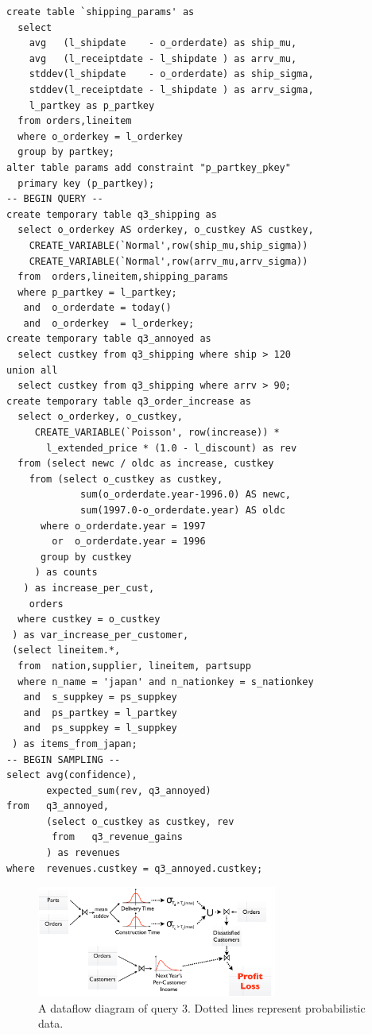 

\begin{footnotesize}
\begin{verbatim}
create table `shipping_params' as
  select 
    avg   (l_shipdate    - o_orderdate) as ship_mu,
    avg   (l_receiptdate - l_shipdate ) as arrv_mu,
    stddev(l_shipdate    - o_orderdate) as ship_sigma,
    stddev(l_receiptdate - l_shipdate ) as arrv_sigma,
    l_partkey as p_partkey
  from orders,lineitem
  where o_orderkey = l_orderkey
  group by partkey;
alter table params add constraint "p_partkey_pkey" 
  primary key (p_partkey);
-- BEGIN QUERY --
create temporary table q3_shipping as
  select o_orderkey AS orderkey, o_custkey AS custkey,
    CREATE_VARIABLE(`Normal',row(ship_mu,ship_sigma))
    CREATE_VARIABLE(`Normal',row(arrv_mu,arrv_sigma))
  from  orders,lineitem,shipping_params
  where p_partkey = l_partkey;
   and  o_orderdate = today()
   and  o_orderkey  = l_orderkey;
create temporary table q3_annoyed as
  select custkey from q3_shipping where ship > 120
union all
  select custkey from q3_shipping where arrv > 90;
create temporary table q3_order_increase as
  select o_orderkey, o_custkey,
     CREATE_VARIABLE(`Poisson', row(increase)) *
       l_extended_price * (1.0 - l_discount) as rev
  from (select newc / oldc as increase, custkey 
    from (select o_custkey as custkey, 
             sum(o_orderdate.year-1996.0) AS newc,
             sum(1997.0-o_orderdate.year) AS oldc
      where o_orderdate.year = 1997 
        or  o_orderdate.year = 1996
      group by custkey
     ) as counts
   ) as increase_per_cust,
    orders
  where custkey = o_custkey
 ) as var_increase_per_customer,
 (select lineitem.*,
  from  nation,supplier, lineitem, partsupp
  where n_name = 'japan' and n_nationkey = s_nationkey
   and  s_suppkey = ps_suppkey
   and  ps_partkey = l_partkey
   and  ps_suppkey = l_suppkey
 ) as items_from_japan;
-- BEGIN SAMPLING --
select avg(confidence),
       expected_sum(rev, q3_annoyed)
from   q3_annoyed,
       (select o_custkey as custkey, rev
        from   q3_revenue_gains
       ) as revenues
where  revenues.custkey = q3_annoyed.custkey;
\end{verbatim}
\end{footnotesize}

\begin{figure}
\begin{center}
\includegraphics[width=3.1in]{graphics/query3.pdf}
\caption{A dataflow diagram of query 3.  Dotted lines represent probabilistic data.}
\label{fig:query3dataflow}
\end{center}
\vspace*{-0.25in}
\end{figure}

